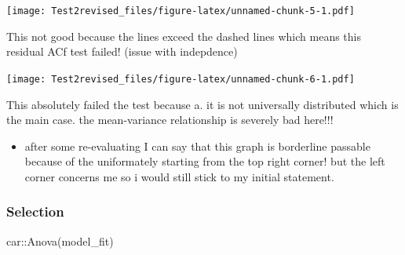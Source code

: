 \documentclass[
]{article}
\newenvironment{Shaded}{\begin{snugshade}}{\end{snugshade}}
\newcommand{\AttributeTok}[1]{\textcolor[rgb]{0.77,0.63,0.00}{#1}}
\newcommand{\FloatTok}[1]{\textcolor[rgb]{0.00,0.00,0.81}{#1}}
\newcommand{\FunctionTok}[1]{\textcolor[rgb]{0.00,0.00,0.00}{#1}}
\newcommand{\NormalTok}[1]{#1}
\newcommand{\OtherTok}[1]{\textcolor[rgb]{0.56,0.35,0.01}{#1}}
\newcommand{\SpecialCharTok}[1]{\textcolor[rgb]{0.00,0.00,0.00}{#1}}
\newcommand{\StringTok}[1]{\textcolor[rgb]{0.31,0.60,0.02}{#1}}
\providecommand{\tightlist}{%
  \setlength{\itemsep}{0pt}\setlength{\parskip}{0pt}}
\begin{document}
\texttt{[image: Test2revised\_files/figure-latex/unnamed-chunk-5-1.pdf]}

This not good because the lines exceed the dashed lines which means this
residual ACf test failed! (issue with indepdence)

\begin{Shaded}
\end{Shaded}

\texttt{[image: Test2revised\_files/figure-latex/unnamed-chunk-6-1.pdf]}

This absolutely failed the test because a. it is not universally
distributed which is the main case. the mean-variance relationship is
severely bad here!!!

\begin{itemize}
\tightlist
\item
  after some re-evaluating I can say that this graph is borderline
  passable because of the uniformately starting from the top right
  corner! but the left corner concerns me so i would still stick to my
  initial statement.
\end{itemize}

\hypertarget{selection}{%
\subsubsection{Selection}\label{selection}}

\begin{Shaded}
\begin{Highlighting}[]
\NormalTok{car}\SpecialCharTok{::}\FunctionTok{Anova}\NormalTok{(model\_fit)}
\end{Highlighting}
\end{Shaded}
\end{document}
